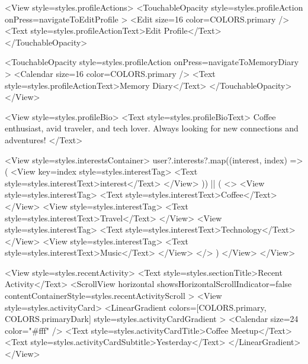 {        <View style={styles.profileActions}>
          <TouchableOpacity
            style={styles.profileAction}
            onPress={navigateToEditProfile}
          >
            <Edit size={16} color={COLORS.primary} />
            <Text style={styles.profileActionText}>Edit Profile</Text>
          </TouchableOpacity>
          
          <TouchableOpacity
            style={styles.profileAction}
            onPress={navigateToMemoryDiary}
          >
            <Calendar size={16} color={COLORS.primary} />
            <Text style={styles.profileActionText}>Memory Diary</Text>
          </TouchableOpacity>
        </View>
        
        <View style={styles.profileBio}>
          <Text style={styles.profileBioText}>
            Coffee enthusiast, avid traveler, and tech lover. Always looking for new connections and adventures!
          </Text>
          
          <View style={styles.interestsContainer}>
            {user?.interests?.map((interest, index) => (
              <View key={index} style={styles.interestTag}>
                <Text style={styles.interestText}>{interest}</Text>
              </View>
            )) || (
              <>
                <View style={styles.interestTag}>
                  <Text style={styles.interestText}>Coffee</Text>
                </View>
                <View style={styles.interestTag}>
                  <Text style={styles.interestText}>Travel</Text>
                </View>
                <View style={styles.interestTag}>
                  <Text style={styles.interestText}>Technology</Text>
                </View>
                <View style={styles.interestTag}>
                  <Text style={styles.interestText}>Music</Text>
                </View>
              </>
            )}
          </View>
        </View>
        
        <View style={styles.recentActivity}>
          <Text style={styles.sectionTitle}>Recent Activity</Text>
          <ScrollView
            horizontal
            showsHorizontalScrollIndicator={false}
            contentContainerStyle={styles.recentActivityScroll}
          >
            <View style={styles.activityCard}>
              <LinearGradient
                colors={[COLORS.primary, COLORS.primaryDark]}
                style={styles.activityCardGradient}
              >
                <Calendar size={24} color="#fff" />
                <Text style={styles.activityCardTitle}>Coffee Meetup</Text>
                <Text style={styles.activityCardSubtitle}>Yesterday</Text>
              </LinearGradient>
            </View>
            
}
